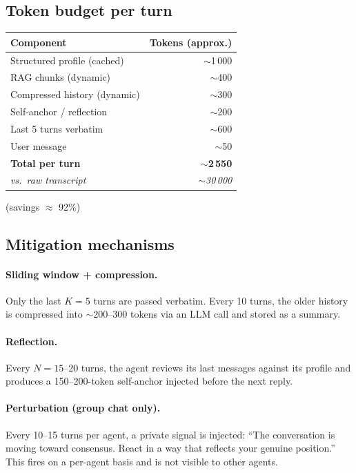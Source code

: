 \documentclass[12pt,a4paper]{article}
\begin{document}
\subsection{Token budget per turn}

\begin{tabular}{@{}lr@{}}
\toprule
\textbf{Component} & \textbf{Tokens (approx.)} \\
\midrule
Structured profile (cached)   & $\sim$1\,000 \\
RAG chunks (dynamic)          & $\sim$400 \\
Compressed history (dynamic)  & $\sim$300 \\
Self-anchor / reflection      & $\sim$200 \\
Last 5 turns verbatim         & $\sim$600 \\
User message                  & $\sim$50 \\
\midrule
\textbf{Total per turn}       & \textbf{$\sim$2\,550} \\
\emph{vs.\ raw transcript}    & \emph{$\sim$30\,000} \\
\bottomrule
\end{tabular}\quad (savings $\approx$ 92\%)

\subsection{Mitigation mechanisms}

\paragraph{Sliding window + compression.}
Only the last $K = 5$ turns are passed verbatim. Every 10 turns, the older history is
compressed into $\sim$200--300 tokens via an LLM call and stored as a summary.

\paragraph{Reflection.}
Every $N = 15$--20 turns, the agent reviews its last messages against its profile and
produces a 150--200-token self-anchor injected before the next reply.

\paragraph{Perturbation (group chat only).}
Every 10--15 turns per agent, a private signal is injected: ``The conversation is moving
toward consensus. React in a way that reflects your genuine position.'' This fires on a
per-agent basis and is not visible to other agents.
\end{document}
